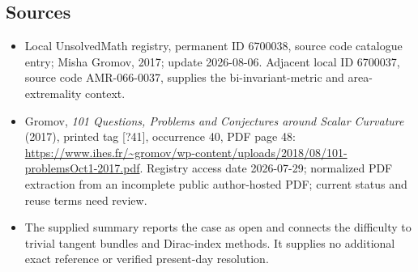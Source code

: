 \documentclass[11pt]{article}
\begin{document}
\subsection{Sources}
\begin{itemize}
\item Local UnsolvedMath registry, permanent ID 6700038, source code catalogue entry; Misha Gromov, 2017; update 2026-08-06. Adjacent local ID 6700037, source code AMR-066-0037, supplies the bi-invariant-metric and area-extremality context.
\item Gromov, \emph{101 Questions, Problems and Conjectures around Scalar Curvature} (2017), printed tag [?41], occurrence 40, PDF page 48: \url{https://www.ihes.fr/~gromov/wp-content/uploads/2018/08/101-problemsOct1-2017.pdf}. Registry access date 2026-07-29; normalized PDF extraction from an incomplete public author-hosted PDF; current status and reuse terms need review.
\item The supplied summary reports the case as open and connects the difficulty to trivial tangent bundles and Dirac-index methods. It supplies no additional exact reference or verified present-day resolution.
\end{itemize}
\end{document}
